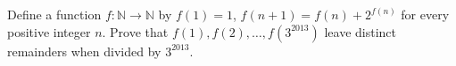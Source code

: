 Define a function $f: \mathbb N \to \mathbb N$ by $f(1) = 1$, $f(n+1) = f(n) + 2^{f(n)}$ for every positive integer $n$.  Prove that $f(1), f(2), \dots, f(3^{2013})$ leave distinct remainders when divided by $3^{2013}$.